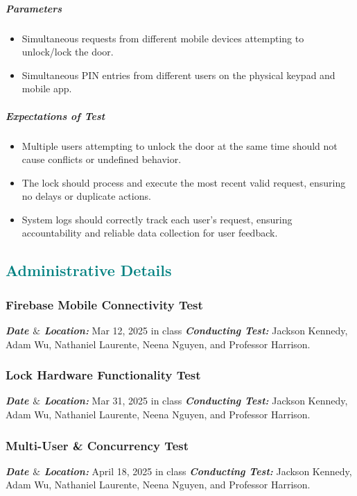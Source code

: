 \subparagraph{Parameters}
\begin{itemize}
    \item Simultaneous requests from different mobile devices attempting to unlock/lock the door.
    \item Simultaneous PIN entries from different users on the physical keypad and mobile app.
\end{itemize}

\subparagraph{Expectations of Test}
\begin{itemize}
    \item Multiple users attempting to unlock the door at the same time should not cause conflicts or undefined behavior.
    \item The lock should process and execute the most recent valid request, ensuring no delays or duplicate actions.
    \item System logs should correctly track each user’s request, ensuring accountability and reliable data collection for user feedback.
\end{itemize}
\newpage

\textcolor{teal}{\subsection*{Administrative Details}}

\subsubsection{Firebase Mobile Connectivity Test}
\textbf{\textit{Date $\&$ Location:}} Mar 12, 2025 in class
\newline
\textbf{\textit{Conducting Test:}} Jackson Kennedy, Adam Wu, Nathaniel Laurente, Neena Nguyen, and Professor Harrison.

\subsubsection{Lock Hardware Functionality Test}
\textbf{\textit{Date $\&$ Location:}} Mar 31, 2025 in class
\newline
\textbf{\textit{Conducting Test:}} Jackson Kennedy, Adam Wu, Nathaniel Laurente, Neena Nguyen, and Professor Harrison.

\subsubsection{Multi-User \& Concurrency Test}
\textbf{\textit{Date $\&$ Location:}} April 18, 2025 in class
\newline
\textbf{\textit{Conducting Test:}} Jackson Kennedy, Adam Wu, Nathaniel Laurente, Neena Nguyen, and Professor Harrison.

